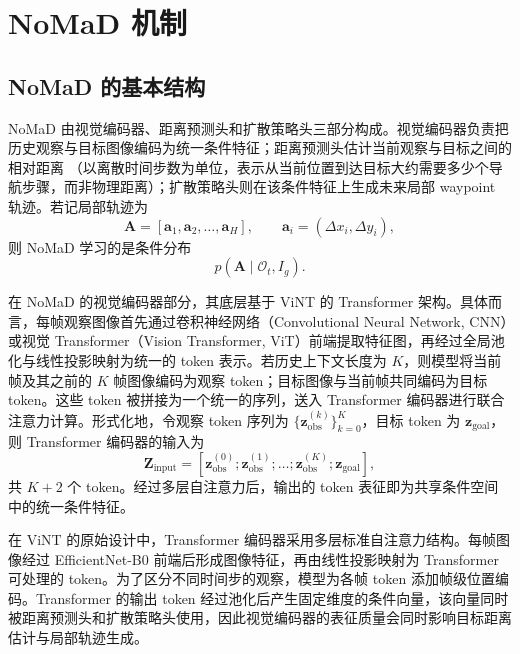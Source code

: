 \section{NoMaD 机制}

\subsection{NoMaD 的基本结构}

NoMaD 由视觉编码器、距离预测头和扩散策略头三部分构成\cite{nomad2023}。视觉编码器负责把历史观察与目标图像编码为统一条件特征；距离预测头估计当前观察与目标之间的相对距离
（以离散时间步数为单位，表示从当前位置到达目标大约需要多少个导航步骤，而非物理距离）；扩散策略头则在该条件特征上生成未来局部 waypoint 轨迹。若记局部轨迹为
\begin{equation}
\mathbf{A} = [\mathbf{a}_1,\mathbf{a}_2,\ldots,\mathbf{a}_H], \qquad \mathbf{a}_i=(\Delta x_i,\Delta y_i),
\end{equation}
则 NoMaD 学习的是条件分布
\begin{equation}
p(\mathbf{A}\mid \mathcal{O}_t, I_g).
\end{equation}

在 NoMaD 的视觉编码器部分，其底层基于 ViNT 的 Transformer 架构。具体而言，每帧观察图像首先通过卷积神经网络（Convolutional Neural Network, CNN）或视觉 Transformer（Vision Transformer, ViT）前端提取特征图，再经过全局池化与线性投影映射为统一的 token 表示。若历史上下文长度为 $K$，则模型将当前帧及其之前的 $K$ 帧图像编码为观察 token；目标图像与当前帧共同编码为目标 token。这些 token 被拼接为一个统一的序列，送入 Transformer 编码器进行联合注意力计算。形式化地，令观察 token 序列为 $\{\mathbf{z}_{\text{obs}}^{(k)}\}_{k=0}^{K}$，目标 token 为 $\mathbf{z}_{\text{goal}}$，则 Transformer 编码器的输入为
\begin{equation}
\mathbf{Z}_{\text{input}} = [\mathbf{z}_{\text{obs}}^{(0)}; \mathbf{z}_{\text{obs}}^{(1)}; \ldots; \mathbf{z}_{\text{obs}}^{(K)}; \mathbf{z}_{\text{goal}}],
\end{equation}
共 $K+2$ 个 token。经过多层自注意力后，输出的 token 表征即为共享条件空间中的统一条件特征。

在 ViNT\cite{vint2023} 的原始设计中，Transformer\cite{transformer2017} 编码器采用多层标准自注意力结构。每帧图像经过 EfficientNet-B0\cite{efficientnet2019} 前端后形成图像特征，再由线性投影映射为 Transformer 可处理的 token。为了区分不同时间步的观察，模型为各帧 token 添加帧级位置编码。Transformer 的输出 token 经过池化后产生固定维度的条件向量，该向量同时被距离预测头和扩散策略头使用，因此视觉编码器的表征质量会同时影响目标距离估计与局部轨迹生成。

